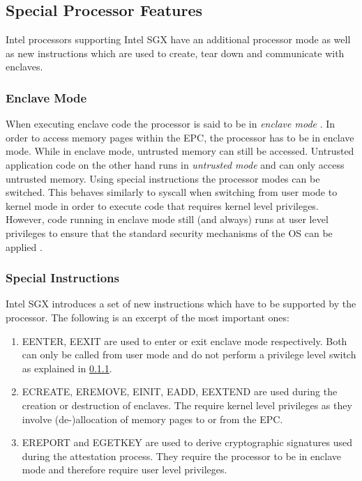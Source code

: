 \subsection{Special Processor Features}
Intel processors supporting Intel SGX have an additional processor mode as well as new instructions which are used to create, tear down and communicate with enclaves.

\subsubsection{Enclave Mode}
\label{sec:EnclaveMode}
When executing enclave code the processor is said to be in \textit{enclave mode} \cite{Costan2016IntelSE}. In order to access memory pages within the EPC, the processor has to
be in enclave mode. While in enclave mode, untrusted memory can still be accessed. Untrusted application code on the other hand runs in \textit{untrusted mode} and can only
access untrusted memory. Using special instructions the processor modes can be switched. This behaves similarly to syscall when switching from user mode to kernel mode in order
to execute code that requires kernel level privileges. However, code running in enclave mode still (and always) runs at user level privileges to ensure that the standard security
mechanisms of the OS can be applied \cite{Costan2016IntelSE}.

\subsubsection{Special Instructions}
Intel SGX introduces a set of new instructions which have to be supported by the processor. The following is an excerpt of the most important ones:
\begin{enumerate}
    \item EENTER, EEXIT are used to enter or exit enclave mode respectively. Both can only be called from user mode and do not perform a privilege level switch as explained
          in \cref{sec:EnclaveMode}.
    \item ECREATE, EREMOVE, EINIT, EADD, EEXTEND are used during the creation or destruction of enclaves. The require kernel level privileges as they involve (de-)allocation
          of memory pages to or from the EPC.
    \item EREPORT and EGETKEY are used to derive cryptographic signatures used during the attestation process. They require the processor to be in enclave mode and therefore
          require user level privileges.
\end{enumerate}